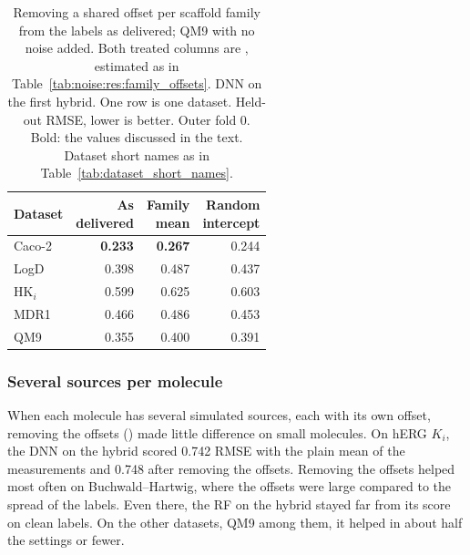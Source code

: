 \begin{table}[htbp]
\centering
\begin{tabular}{@{}lrrr@{}}
\toprule
Dataset & \makecell[r]{As\\delivered} & \makecell[r]{Family\\mean} & \makecell[r]{Random\\intercept} \\
\midrule
Caco-2 & \textbf{0.233} & \textbf{0.267} & 0.244 \\
LogD & 0.398 & 0.487 & 0.437 \\
HK$_i$ & 0.599 & 0.625 & 0.603 \\
MDR1 & 0.466 & 0.486 & 0.453 \\
QM9 & 0.355 & 0.400 & 0.391 \\
\bottomrule
\end{tabular}
\caption[Removing family offsets from the labels as delivered.]{Removing a shared offset per scaffold family from the labels as delivered; QM9 with no noise added. Both treated columns are , estimated as in Table~\ref{tab:noise:res:family_offsets}. DNN on the first hybrid. One row is one dataset. Held-out RMSE, lower is better. Outer fold 0. Bold: the values discussed in the text. Dataset short names as in Table~\ref{tab:dataset_short_names}.}
\label{tab:noise:res:offsets_delivered}
\end{table}

\subsubsection{Several sources per molecule}\label{sec:noise:res:sources}

When each molecule has several simulated sources, each with its own offset, removing the offsets () made little difference on small molecules. On hERG $K_i$, the DNN on the hybrid scored 0.742 RMSE with the plain mean of the measurements and 0.748 after removing the offsets. Removing the offsets helped most often on Buchwald--Hartwig, where the offsets were large compared to the spread of the labels. Even there, the RF on the hybrid stayed far from its score on clean labels. On the other datasets, QM9 among them, it helped in about half the settings or fewer.


